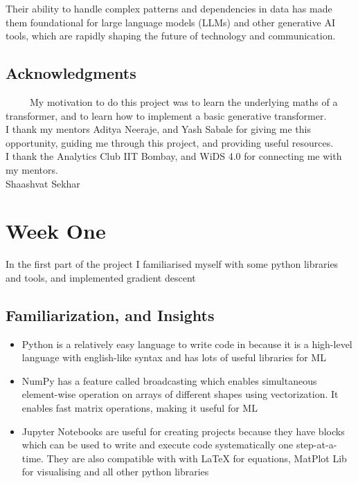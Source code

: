 \documentclass[12pt,a4paper]{article}
\begin{document}
Their ability to handle complex patterns and dependencies in data has made them foundational for large language models (LLMs) and other generative AI tools, which are rapidly shaping the future of technology and communication.\\
\subsection{Acknowledgments}
 \ \ \ \ \ My motivation to do this project was to learn the underlying maths of a transformer, and to learn how to implement a basic generative transformer.\\

I thank my mentors Aditya Neeraje, and Yash Sabale for giving me this opportunity, guiding me through this project, and providing useful resources. \\

I thank the Analytics Club IIT Bombay, and WiDS 4.0 for connecting me with my mentors. \\

Shaashvat Sekhar


\pagebreak


\section{Week One}
In the first part of the project I familiarised myself with some python libraries and tools, and implemented gradient descent
\subsection{Familiarization, and Insights}
\begin{itemize}
\item Python is a relatively easy language to write code in because it is a high-level language with english-like syntax and has lots of useful libraries for ML
\item NumPy has a feature called broadcasting which enables simultaneous element-wise operation on arrays of different shapes using vectorization. It enables fast matrix operations, making it useful for ML
\item Jupyter Notebooks are useful for creating projects because they have blocks which can be used to write and execute code systematically one step-at-a-time. They are also compatible with with LaTeX for equations, MatPlot Lib for visualising and all other python libraries
\end{itemize}
\end{document}

